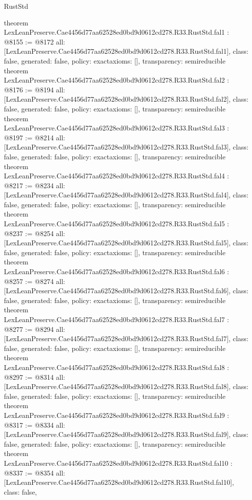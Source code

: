 \begin{lexlean}{RustStd}
\begin{coremodule}
{}
theorem LexLeanPreserve.Cae4456d77aa62528ed0bd9d0612cd278.R33.RustStd.fal1 : @8155 := @8172 {
  all: [LexLeanPreserve.Cae4456d77aa62528ed0bd9d0612cd278.R33.RustStd.fal1],
  class: false,
  generated: false,
  policy: exact{axioms: []},
  transparency: semireducible
}
theorem LexLeanPreserve.Cae4456d77aa62528ed0bd9d0612cd278.R33.RustStd.fal2 : @8176 := @8194 {
  all: [LexLeanPreserve.Cae4456d77aa62528ed0bd9d0612cd278.R33.RustStd.fal2],
  class: false,
  generated: false,
  policy: exact{axioms: []},
  transparency: semireducible
}
theorem LexLeanPreserve.Cae4456d77aa62528ed0bd9d0612cd278.R33.RustStd.fal3 : @8197 := @8214 {
  all: [LexLeanPreserve.Cae4456d77aa62528ed0bd9d0612cd278.R33.RustStd.fal3],
  class: false,
  generated: false,
  policy: exact{axioms: []},
  transparency: semireducible
}
theorem LexLeanPreserve.Cae4456d77aa62528ed0bd9d0612cd278.R33.RustStd.fal4 : @8217 := @8234 {
  all: [LexLeanPreserve.Cae4456d77aa62528ed0bd9d0612cd278.R33.RustStd.fal4],
  class: false,
  generated: false,
  policy: exact{axioms: []},
  transparency: semireducible
}
theorem LexLeanPreserve.Cae4456d77aa62528ed0bd9d0612cd278.R33.RustStd.fal5 : @8237 := @8254 {
  all: [LexLeanPreserve.Cae4456d77aa62528ed0bd9d0612cd278.R33.RustStd.fal5],
  class: false,
  generated: false,
  policy: exact{axioms: []},
  transparency: semireducible
}
theorem LexLeanPreserve.Cae4456d77aa62528ed0bd9d0612cd278.R33.RustStd.fal6 : @8257 := @8274 {
  all: [LexLeanPreserve.Cae4456d77aa62528ed0bd9d0612cd278.R33.RustStd.fal6],
  class: false,
  generated: false,
  policy: exact{axioms: []},
  transparency: semireducible
}
theorem LexLeanPreserve.Cae4456d77aa62528ed0bd9d0612cd278.R33.RustStd.fal7 : @8277 := @8294 {
  all: [LexLeanPreserve.Cae4456d77aa62528ed0bd9d0612cd278.R33.RustStd.fal7],
  class: false,
  generated: false,
  policy: exact{axioms: []},
  transparency: semireducible
}
theorem LexLeanPreserve.Cae4456d77aa62528ed0bd9d0612cd278.R33.RustStd.fal8 : @8297 := @8314 {
  all: [LexLeanPreserve.Cae4456d77aa62528ed0bd9d0612cd278.R33.RustStd.fal8],
  class: false,
  generated: false,
  policy: exact{axioms: []},
  transparency: semireducible
}
theorem LexLeanPreserve.Cae4456d77aa62528ed0bd9d0612cd278.R33.RustStd.fal9 : @8317 := @8334 {
  all: [LexLeanPreserve.Cae4456d77aa62528ed0bd9d0612cd278.R33.RustStd.fal9],
  class: false,
  generated: false,
  policy: exact{axioms: []},
  transparency: semireducible
}
theorem LexLeanPreserve.Cae4456d77aa62528ed0bd9d0612cd278.R33.RustStd.fal10 : @8337 := @8354 {
  all: [LexLeanPreserve.Cae4456d77aa62528ed0bd9d0612cd278.R33.RustStd.fal10],
  class: false,
}
\end{coremodule}
\end{lexlean}
